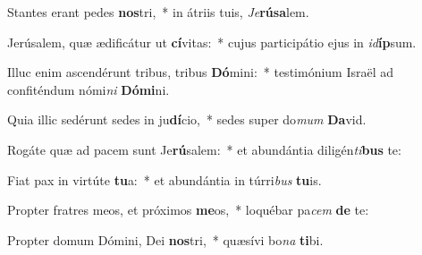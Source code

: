 \item Stantes erant pedes \textbf{nos}tri,~* in átriis tuis, \textit{Je}\textbf{rú}\textbf{sa}lem.
\item Jerúsalem, quæ ædificátur ut \textbf{cí}vitas:~* cujus participátio ejus in \textit{id}\textbf{íp}sum.
\item Illuc enim ascendérunt tribus, tribus \textbf{Dó}mini:~* testimónium Israël ad confiténdum nómi\textit{ni} \textbf{Dó}\textbf{mi}ni.
\item Quia illic sedérunt sedes in ju\textbf{dí}cio,~* sedes super do\textit{mum} \textbf{Da}vid.
\item Rogáte quæ ad pacem sunt Je\textbf{rú}salem:~* et abundántia diligén\textit{ti}\textbf{bus} te:
\item Fiat pax in virtúte \textbf{tu}a:~* et abundántia in túrri\textit{bus} \textbf{tu}is.
\item Propter fratres meos, et próximos \textbf{me}os,~* loquébar pa\textit{cem} \textbf{de} te:
\item Propter domum Dómini, Dei \textbf{nos}tri,~* quæsívi bo\textit{na} \textbf{ti}bi.
